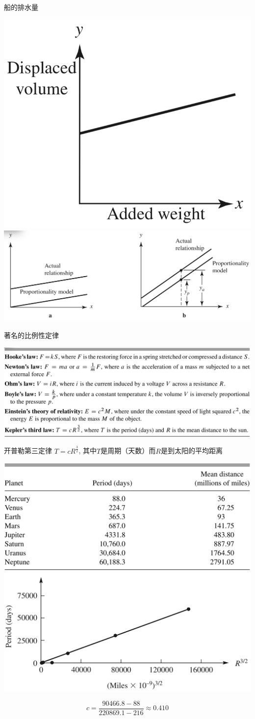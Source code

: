 \documentclass[UTF8, mathserif]{ctexbeamer}
\begin{document}
\begin{frame}{船的排水量}
  \begin{center}
    \includegraphics[width=.3\textwidth{}]{boatwater.png}
    \includegraphics[width=.6\textwidth{}]{propapprox.png}
  \end{center}
\end{frame}

\begin{frame}{著名的比例性定律}
  \begin{center}
    \includegraphics[width=.8\textwidth{}]{proptheory.png}
  \end{center}
\end{frame}

\begin{frame}{开普勒第三定律}
  $T=cR^{\frac{3}{2}}$, 其中$T$是周期（天数）而$R$是到太阳的平均距离

  \begin{center}
    \includegraphics[width=.45\textwidth{}]{keplertable.png}
    \includegraphics[width=.45\textwidth{}]{keplerfig.png}
  \end{center}

  \[
  c = \frac{90466.8-88}{220869.1-216} \approx 0.410
  \]
  
\end{frame}
\end{document}
